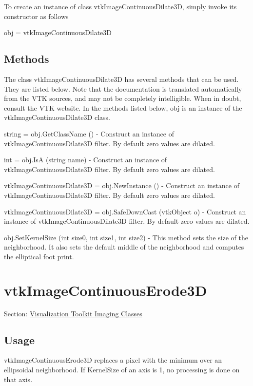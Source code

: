To create an instance of class vtk\-Image\-Continuous\-Dilate3\-D, simply invoke its constructor as follows \begin{DoxyVerb}  obj = vtkImageContinuousDilate3D
\end{DoxyVerb}
 \hypertarget{vtkwidgets_vtkxyplotwidget_Methods}{}\subsection{Methods}\label{vtkwidgets_vtkxyplotwidget_Methods}
The class vtk\-Image\-Continuous\-Dilate3\-D has several methods that can be used. They are listed below. Note that the documentation is translated automatically from the V\-T\-K sources, and may not be completely intelligible. When in doubt, consult the V\-T\-K website. In the methods listed below, {\ttfamily obj} is an instance of the vtk\-Image\-Continuous\-Dilate3\-D class. 
\begin{DoxyItemize}
\item {\ttfamily string = obj.\-Get\-Class\-Name ()} -\/ Construct an instance of vtk\-Image\-Continuous\-Dilate3\-D filter. By default zero values are dilated.  
\item {\ttfamily int = obj.\-Is\-A (string name)} -\/ Construct an instance of vtk\-Image\-Continuous\-Dilate3\-D filter. By default zero values are dilated.  
\item {\ttfamily vtk\-Image\-Continuous\-Dilate3\-D = obj.\-New\-Instance ()} -\/ Construct an instance of vtk\-Image\-Continuous\-Dilate3\-D filter. By default zero values are dilated.  
\item {\ttfamily vtk\-Image\-Continuous\-Dilate3\-D = obj.\-Safe\-Down\-Cast (vtk\-Object o)} -\/ Construct an instance of vtk\-Image\-Continuous\-Dilate3\-D filter. By default zero values are dilated.  
\item {\ttfamily obj.\-Set\-Kernel\-Size (int size0, int size1, int size2)} -\/ This method sets the size of the neighborhood. It also sets the default middle of the neighborhood and computes the elliptical foot print.  
\end{DoxyItemize}\hypertarget{vtkimaging_vtkimagecontinuouserode3d}{}\section{vtk\-Image\-Continuous\-Erode3\-D}\label{vtkimaging_vtkimagecontinuouserode3d}
Section\-: \hyperlink{sec_vtkimaging}{Visualization Toolkit Imaging Classes} \hypertarget{vtkwidgets_vtkxyplotwidget_Usage}{}\subsection{Usage}\label{vtkwidgets_vtkxyplotwidget_Usage}
vtk\-Image\-Continuous\-Erode3\-D replaces a pixel with the minimum over an ellipsoidal neighborhood. If Kernel\-Size of an axis is 1, no processing is done on that axis.


